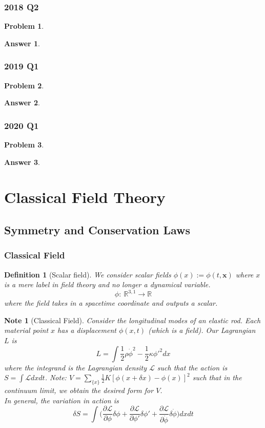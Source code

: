 \documentclass[a4paper]{article}
\newtheorem{ans}{Answer}[section]
\newtheorem{defi}{Definition}[section]
\newtheorem{note}{Note}[section]
\theoremstyle{new}
\newtheorem{qns}{Problem}[section]
\begin{document}
\subsubsection*{2018 Q2}
\begin{qns}

\end{qns}
\begin{ans}

\end{ans}
\newpage
\subsubsection*{2019 Q1}
\begin{qns}

\end{qns}
\begin{ans}

\end{ans}
\newpage
\subsubsection*{2020 Q1}
\begin{qns}

\end{qns}
\begin{ans}

\end{ans}
\newpage
\section{Classical Field Theory}
\subsection{Symmetry and Conservation Laws}
\subsubsection{Classical Field}
\begin{defi}[Scalar field]
We consider scalar fields $\phi(x):=\phi(t,\mathbf{x})$ where $x$ is a mere label in field theory and no longer a dynamical variable. 
$$\phi:~\mathbb{R}^{3,1}\rightarrow\mathbb{R}$$
where the field takes in a spacetime coordinate and outputs a scalar.
\end{defi}
\begin{note}[Classical Field]
Consider the longitudinal modes of an elastic rod. Each material point $x$ has a displacement $\phi(x,t)$ (which is a field). Our Lagrangian $L$ is 
$$L=\int\frac{1}{2}\rho\dot{\phi}^2-\frac{1}{2}\kappa\phi'^2dx$$
where the integrand is the Lagrangian density $\mathcal{L}$ such that the action is $S=\int\mathcal{L}dxdt$. Note: $V=\sum_{\{x\}}\frac{1}{2}K[\phi(x+\delta x)-\phi(x)]^2$ such that in the continuum limit, we obtain the desired form for $V$.\\[5pt]
In general, the variation in action is
$$\delta S=\int\bigg(\frac{\partial\mathcal{L}}{\partial\phi}\delta\phi+\frac{\partial\mathcal{L}}{\partial\phi'}\delta\phi'+\frac{\partial\mathcal{L}}{\partial\dot{\phi}}\delta\dot{\phi}\bigg)dxdt$$
\end{note}
\end{document}
